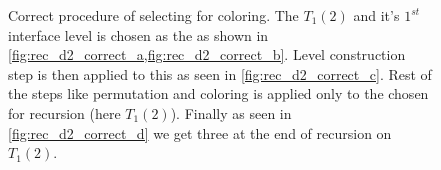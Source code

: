      
     \begin{figure}[thbp]
     	\centering
     	\hspace{0.6em}
     	\hspace{0.6em}
     	\hspace{0.6em}
     	\hspace{0.6em}
     	\caption{Correct procedure of selecting \subgraph for \DTWO coloring. The \levelGroup $T_1(2)$ and it's $1^{st}$ interface level is chosen as the \subgraph as shown in \cref{fig:rec_d2_correct_a,fig:rec_d2_correct_b}. Level construction step is then applied to this \subgraph as seen in \cref{fig:rec_d2_correct_c}. Rest of the steps like permutation and \DK coloring is applied only to the \subgraph  chosen for recursion (here $T_1(2)$). Finally as seen in \cref{fig:rec_d2_correct_d} we get three \levelGroups at the end of recursion on $T_1(2)$.}
     	\label{fig:rec_d2_correct}
     \end{figure}
     

